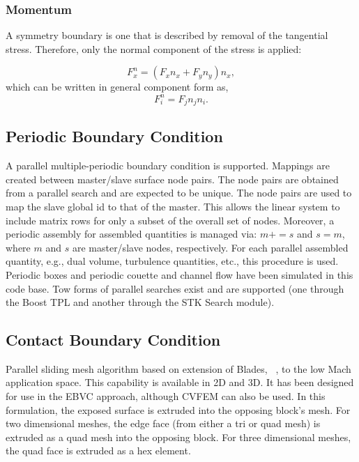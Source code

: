 \subsubsection{Momentum}
A symmetry boundary is one that is described by removal of the tangential stress. Therefore, only
the normal component of the stress is applied:

\begin{equation}
  F^n_x = (F_x n_x + F_y n_y ) n_x,
\end{equation}
which can be written in general component form as,
\begin{equation}
  F^n_i = F_j n_j n_i.
\end{equation}

\subsection{Periodic Boundary Condition}
A parallel multiple-periodic boundary condition is supported. Mappings are created between
master/slave surface node pairs. The node pairs are obtained from a parallel search and are expected
to be unique. The node pairs are used to map the slave global id to that of the master. This allows the linear
system to include matrix rows for only a subset of the overall set of nodes. Moreover, a periodic 
assembly for assembled quantities is managed via: $m+=s$ and $s=m$, where $m$ and $s$ are master/slave nodes, 
respectively. For each parallel assembled quantity, e.g., dual volume, turbulence quantities, etc., this procedure
is used. Periodic boxes and periodic couette and channel flow have been simulated in this code base. Tow forms of
parallel searches exist and are supported (one through the Boost TPL and another through the STK Search module).

\subsection{Contact Boundary Condition}
Parallel sliding mesh algorithm based on extension of Blades, ~\cite{Blades:2004}, to the low Mach application space. This capability is 
available in 2D and 3D. It has been designed for use in the EBVC approach, although CVFEM can also be used. 
In this formulation, the exposed  surface is extruded into the opposing block's mesh.
For two dimensional meshes, the edge face (from either a tri or quad mesh) is extruded as a quad mesh
into the opposing block. For three dimensional meshes, the quad face is extruded as a hex element.

